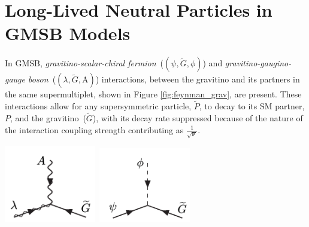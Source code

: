 \section{Long-Lived Neutral Particles in GMSB Models}\label{long-lived}
\par 
In GMSB, \textit{gravitino-scalar-chiral fermion}~($(\psi,\tilde{G},\phi)$) and \textit{gravitino-gaugino-gauge boson}~($(\lambda,\tilde{G},\mathrm{A})$) interactions, between the gravitino and its partners in the same supermultiplet, shown in Figure \ref{fig:feynman_grav}, are present. These interactions allow for any supersymmetric particle, $\tilde{P}$, to decay to its SM partner, $P$, and the gravitino~($\tilde{G}$), with its decay rate suppressed because of the nature of the interaction coupling strength contributing as $\frac{1}{\sqrt{\mathbf{F}}}$.

\vspace{5mm}
\begin{minipage}{0.90\linewidth}
\begin{center}
\centering
\mbox{\includegraphics[height=0.3\textwidth, width=0.3\textwidth]{THESISPLOTS/Gravitino-Gaugino-Coupling.png} \quad
\includegraphics[height=0.3\textwidth, width=0.3\textwidth]{THESISPLOTS/Gravitino-Scalar-Coupling.png}
} 
\label{fig:feynman_grav}
\end{center}
\end{minipage}

